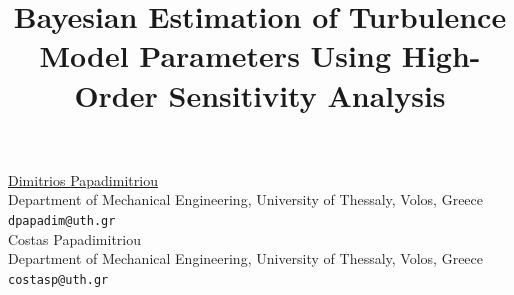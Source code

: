 \documentclass[article, A4, 11pt]{llncs}%
\begin{document}
\title{Bayesian Estimation of Turbulence Model Parameters Using High-Order Sensitivity Analysis}
 \author{} \institute{}
\maketitle
\begin{center}
{\large \underline{Dimitrios Papadimitriou}}\\
Department of Mechanical Engineering, University of Thessaly, Volos, Greece\\
{\tt dpapadim@uth.gr}
\\ \vspace{4mm}
{\large Costas Papadimitriou}\\
Department of Mechanical Engineering, University of Thessaly, Volos, Greece\\
{\tt costasp@uth.gr}
\end{center}
\end{document}
